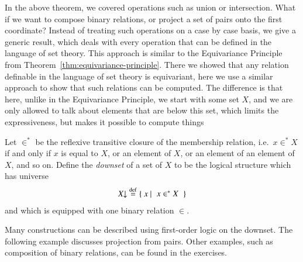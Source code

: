 In the above theorem, we covered operations such as union or intersection. What if we want  to compose binary relations, or project a set of pairs onto the first coordinate?  Instead of treating  such operations on a case by case basis, we give a generic result, which deals with every operation that can be defined in the language of set theory. This approach is similar to the Equivariance Principle from Theorem~\ref{thm:equivariance-principle}. There we showed that any relation definable in the language of set theory is equivariant, here we use a similar approach to show that such relations can be computed. The difference is that here, unlike in the Equivariance Principle, we start with some set $X$, and we are only allowed to talk about elements that are below this set, which limits the expressiveness, but makes it possible to compute things

\newcommand{\downset}[1]{#1\!\!\downarrow\xspace}
\begin{definition}[Downset]\label{def:set-structure}
	Let $\in^*$ be the reflexive transitive closure of the membership relation, i.e.~$x \in^* X$ if and only if $x$ is equal to $X$, or an element of $X$, or an element of an element of $X$, and so on.  
	Define the \emph{downset} of a set of $X$ to be the logical structure which has universe
	\begin{align*}
	\downset X \ 
	\eqdef \setbuild{x}{$x \in^* X$}
	\end{align*}
	and which is equipped with one binary relation $\in$.
\end{definition}

Many  constructions can be described using first-order logic on the downset.
 The following example discusses projection from pairs. Other examples, such as composition of binary relations, can be found in the exercises.

